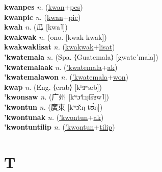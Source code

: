 \textbf{kwanpes} \textit{n.} (\hyperref[kwan]{kwan}+\hyperref[pes]{pes})
 \label{kwanpes} \\
\textbf{kwanpic} \textit{n.} (\hyperref[kwan]{kwan}+\hyperref[pic]{pic})
 \label{kwanpic} \\
\textbf{kwah} \textit{n.} ({\chinese{}瓜} [kwa˥])
 \label{kwah} \\
\textbf{kwakwak} \textit{n.} (ono. [kwak kwak])
 \label{kwakwak} \\
\textbf{kwakwaklisat} \textit{n.} (\hyperref[kwakwak]{kwakwak}+\hyperref[lisat]{lisat})
 \label{kwakwaklisat} \\
\textbf{'kwatemala} \textit{n.} (Spa. ⟨Guatemala⟩ [gwateˈmala])
 \label{'kwatemala} \\
\textbf{'kwatemalaak} \textit{n.} (\hyperref['kwatemala]{'kwatemala}+\hyperref[ak]{ak})
 \label{'kwatemalaak} \\
\textbf{'kwatemalawon} \textit{n.} (\hyperref['kwatemala]{'kwatemala}+\hyperref[won]{won})
 \label{'kwatemalawon} \\
\textbf{kwap} \textit{n.} (Eng. ⟨crab⟩ [kʰɹʷæb])
 \label{kwap} \\
\textbf{'kwonsaw} \textit{n.} ({\chinese{}广州} [kʷɔ˧˥ːŋt͡sɐw˥])
 \label{'kwonsaw} \\
\textbf{'kwontun} \textit{n.} ({\chinese{}廣東} [kʷɔ̌ːŋ tʊ́ŋ])
 \label{'kwontun} \\
\textbf{'kwontunak} \textit{n.} (\hyperref['kwontun]{'kwontun}+\hyperref[ak]{ak})
 \label{'kwontunak} \\
\textbf{'kwontuntilip} \textit{n.} (\hyperref['kwontun]{'kwontun}+\hyperref[tilip]{tilip})
 \label{'kwontuntilip} 

\section{T}

